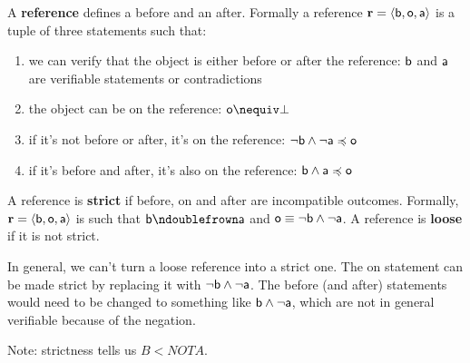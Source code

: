 \documentclass[11pt,letterpaper,fleqn]{memoir} %
\begin{document}
\begin{mathSection}
	\begin{defn}
		A \textbf{reference} defines a before and an after. Formally a reference $\refStmt = \langle \stmt[b], \stmt[o], \stmt[a] \rangle$ is a tuple of three statements such that:
		\begin{enumerate}
			\item we can verify that the object is either before or after the reference: $\stmt[b]$ and $\stmt[a]$ are verifiable statements or contradictions
			\item the object can be on the reference: $\stmt[o] \nequiv \contradiction$
			\item if it's not before or after, it's on the reference: $\NOT \stmt[b] \AND \NOT \stmt[a] \narrower \stmt[o]$
			\item if it's before and after, it's also on the reference: $\stmt[b] \AND \stmt[a] \narrower \stmt[o]$
		\end{enumerate}
	\end{defn}
	\begin{defn}
	A reference is \textbf{strict} if before, on and after are incompatible outcomes. Formally, $\refStmt = \langle \stmt[b], \stmt[o], \stmt[a] \rangle$ is such that $\stmt[b] \ncomp \stmt[a]$ and $\stmt[o] \equiv \NOT \stmt[b] \AND \NOT \stmt[a]$. A reference is \textbf{loose} if it is not strict.
\end{defn}
\begin{remark}
	In general, we can't turn a loose reference into a strict one. The on statement can be made strict by replacing it with $\NOT \stmt[b] \AND \NOT \stmt[a]$. The before (and after) statements would need to be changed to something like $\stmt[b] \AND \NOT \stmt[a]$, which are not in general verifiable because of the negation.
\end{remark}
\end{mathSection}

Note: strictness tells us $B < NOT A$.
\end{document}
